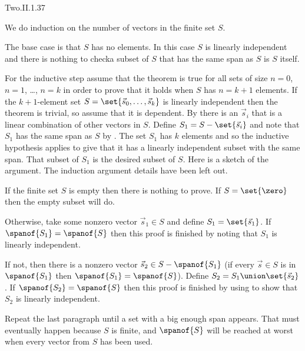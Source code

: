 \begin{ans}{Two.II.1.37}
      \begin{exparts}
         \partsitem We do induction on the number of vectors in the finite set
           \( S \).

           The base case is that $S$ has no elements.
           In this case $S$ is linearly independent and there is nothing to
           check\Dash a subset of $S$ that has the same span as $S$ is $S$
           itself.

           For the inductive step assume that the theorem is true for all
           sets of size $n=0$, $n=1$, \ldots, $n=k$
           in order to prove that it holds when \( S \) has $n=k+1$ elements.
           If the $k+1$-element set \( S=\set{\vec{s}_0,\dots,\vec{s}_{k}} \)
           is linearly independent then the theorem is trivial,
           so assume that it is dependent.
           By  there is an \( \vec{s}_i \)
           that is a linear combination of other vectors in \( S \).
           Define \( S_1=S-\set{\vec{s}_i} \) and note that
           \( S_1 \) has the same span as \( S \) by
           .
           The set \( S_1 \) has \( k \) elements and
           so the inductive hypothesis
           applies to give that it has a linearly independent subset with the
           same span.
           That subset of \( S_1 \) is the desired subset of \( S \).
         \partsitem Here is a sketch of the argument.
           The induction argument details have been left out.

           If the finite set \( S \) is empty then there is nothing to prove.
           If \( S=\set{\zero} \) then the empty subset will do.

           Otherwise, take some nonzero vector \( \vec{s}_1\in S \)
           and define \( S_1=\set{\vec{s}_1} \).
           If \( \spanof{S_1}=\spanof{S} \) then
           this proof is finished by noting that \( S_1 \) is linearly
           independent.

           If not, then there is a nonzero
           vector \( \vec{s}_2\in S-\spanof{S_1} \)
           (if every \( \vec{s}\in S \) is in \( \spanof{S_1} \) then
           \( \spanof{S_1}=\spanof{S} \)).
           Define \( S_2=S_1\union\set{\vec{s}_2} \).
           If \( \spanof{S_2}=\spanof{S} \) then
           this proof is finished by using 
           to show that \( S_2 \) is linearly independent.

           Repeat the last paragraph until a set with a big enough
           span appears.
           That must eventually happen
           because \( S \) is finite, and
           \( \spanof{S} \) will be reached at worst when every vector from
           \( S \) has been used.
      \end{exparts}
    
\end{ans}
